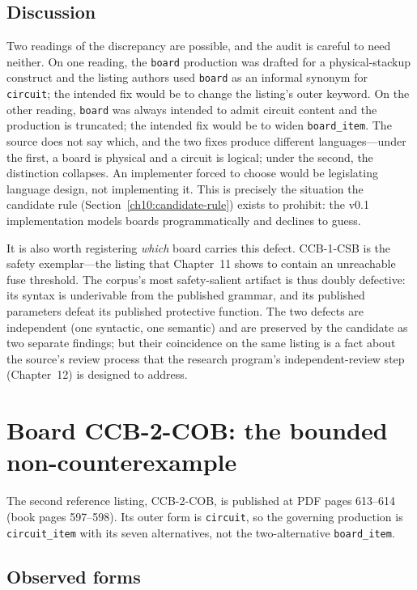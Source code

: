 \subsection{Discussion}

Two readings of the discrepancy are possible, and the audit is careful to need neither. On one reading, the \texttt{board} production was drafted for a physical-stackup construct and the listing authors used \texttt{board} as an informal synonym for \texttt{circuit}; the intended fix would be to change the listing's outer keyword. On the other reading, \texttt{board} was always intended to admit circuit content and the production is truncated; the intended fix would be to widen \texttt{board\_item}. The source does not say which, and the two fixes produce different languages---under the first, a board is physical and a circuit is logical; under the second, the distinction collapses. An implementer forced to choose would be legislating language design, not implementing it. This is precisely the situation the candidate rule (Section~\ref{ch10:candidate-rule}) exists to prohibit: the v0.1 implementation models boards programmatically and declines to guess.

It is also worth registering \emph{which} board carries this defect. CCB-1-CSB is the safety exemplar---the listing that Chapter~11 shows to contain an unreachable fuse threshold. The corpus's most safety-salient artifact is thus doubly defective: its syntax is underivable from the published grammar, and its published parameters defeat its published protective function. The two defects are independent (one syntactic, one semantic) and are preserved by the candidate as two separate findings; but their coincidence on the same listing is a fact about the source's review process that the research program's independent-review step (Chapter~12) is designed to address.

\section{Board CCB-2-COB: the bounded non-counterexample}\label{ch10:ccb2}

The second reference listing, CCB-2-COB, is published at PDF pages 613--614 (book pages 597--598). Its outer form is \texttt{circuit}, so the governing production is \texttt{circuit\_item} with its seven alternatives, not the two-alternative \texttt{board\_item}.

\subsection{Observed forms}

